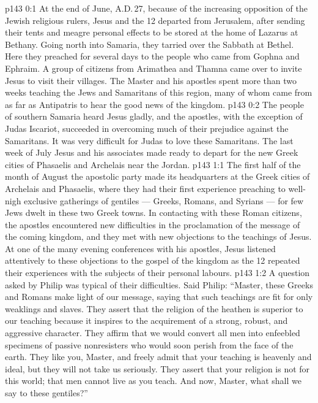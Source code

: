 \author{Midwayer Commission}
\vs p143 0:1 At the end of June, A.D.\,27, because of the increasing opposition of the Jewish religious rulers, Jesus and the 12 departed from Jerusalem, after sending their tents and meagre personal effects to be stored at the home of Lazarus at Bethany. Going north into Samaria, they tarried over the Sabbath at Bethel. Here they preached for several days to the people who came from Gophna and Ephraim. A group of citizens from Arimathea and Thamna came over to invite Jesus to visit their villages. The Master and his apostles spent more than two weeks teaching the Jews and Samaritans of this region, many of whom came from as far as Antipatris to hear the good news of the kingdom.
\vs p143 0:2 The people of southern Samaria heard Jesus gladly, and the apostles, with the exception of Judas Iscariot, succeeded in overcoming much of their prejudice against the Samaritans. It was very difficult for Judas to love these Samaritans. The last week of July Jesus and his associates made ready to depart for the new Greek cities of Phasaelis and Archelais near the Jordan.
\vs p143 1:1 The first half of the month of August the apostolic party made its headquarters at the Greek cities of Archelais and Phasaelis, where they had their first experience preaching to well\hyp{}nigh exclusive gatherings of gentiles --- Greeks, Romans, and Syrians --- for few Jews dwelt in these two Greek towns. In contacting with these Roman citizens, the apostles encountered new difficulties in the proclamation of the message of the coming kingdom, and they met with new objections to the teachings of Jesus. At one of the many evening conferences with his apostles, Jesus listened attentively to these objections to the gospel of the kingdom as the 12 repeated their experiences with the subjects of their personal labours.
\vs p143 1:2 A question asked by Philip was typical of their difficulties. Said Philip: “Master, these Greeks and Romans make light of our message, saying that such teachings are fit for only weaklings and slaves. They assert that the religion of the heathen is superior to our teaching because it inspires to the acquirement of a strong, robust, and aggressive character. They affirm that we would convert all men into enfeebled specimens of passive nonresisters who would soon perish from the face of the earth. They like you, Master, and freely admit that your teaching is heavenly and ideal, but they will not take us seriously. They assert that your religion is not for this world; that men cannot live as you teach. And now, Master, what shall we say to these gentiles?”
